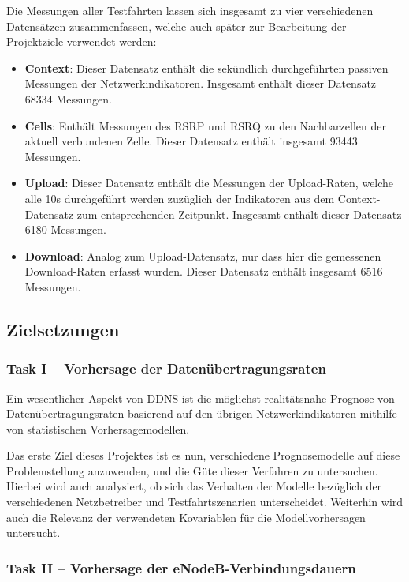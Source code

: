 Die Messungen aller Testfahrten lassen sich insgesamt zu vier verschiedenen Datens\"atzen zusammenfassen, welche auch sp\"ater
zur Bearbeitung der Projektziele verwendet werden:
\begin{itemize}
    \item \textbf{Context}: Dieser Datensatz enth\"alt die sek\"undlich durchgef\"uhrten passiven Messungen der Netzwerkindikatoren.
        Insgesamt enth\"alt dieser Datensatz 68334 Messungen.
    \item \textbf{Cells}: Enth\"alt Messungen des RSRP und RSRQ zu den Nachbarzellen der aktuell verbundenen Zelle.
        Dieser Datensatz enth\"alt insgesamt 93443 Messungen.
    \item \textbf{Upload}: Dieser Datensatz enth\"alt die Messungen der Upload-Raten, welche alle 10s durchgef\"uhrt werden zuz\"uglich
        der Indikatoren aus dem Context-Datensatz zum entsprechenden Zeitpunkt. Insgesamt enth\"alt dieser Datensatz 6180 Messungen.
    \item \textbf{Download}: Analog zum Upload-Datensatz, nur dass hier die gemessenen Down\-load-Ra\-ten erfasst wurden.
        Dieser Datensatz enth\"alt insgesamt 6516 Messungen.
\end{itemize}

\subsection{Zielsetzungen}

\subsubsection{Task I -- Vorhersage der Daten\"ubertragungsraten}

Ein wesentlicher Aspekt von DDNS ist die m\"oglichst realit\"atsnahe Prognose von Daten\"ubertragungsraten basierend auf
den \"ubrigen Netzwerkindikatoren mithilfe von statistischen Vorhersagemodellen.

Das erste Ziel dieses Projektes ist es nun, verschiedene Prognosemodelle
auf diese Problemstellung an\-zu\-wen\-den, und die G\"ute dieser Verfahren zu untersuchen.
Hierbei wird auch analysiert, ob sich das Verhalten der Modelle bez\"uglich der verschiedenen Netzbetreiber und Testfahrtszenarien
unterscheidet.
Weiterhin wird auch die Relevanz der verwendeten Kovariablen f\"ur die Modellvorhersagen untersucht.

\subsubsection{Task II -- Vorhersage der eNodeB-Verbindungsdauern}

